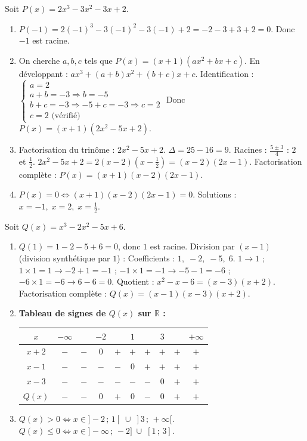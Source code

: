 \documentclass[11pt]{article}
\begin{document}
\begin{corrige}
Soit $P(x)=2x^3-3x^2-3x+2$.
\begin{enumerate}
\item $P(-1)=2(-1)^3-3(-1)^2-3(-1)+2 = -2-3+3+2=0$. Donc $-1$ est racine.
\item On cherche $a,b,c$ tels que $P(x)=(x+1)(ax^2+bx+c)$. En développant : $ax^3+(a+b)x^2+(b+c)x+c$. Identification :
$\begin{cases} a=2 \\ a+b=-3 \Rightarrow b=-5 \\ b+c=-3 \Rightarrow -5+c=-3 \Rightarrow c=2 \\ c=2 \text{ (vérifié)} \end{cases}$
Donc $P(x)=(x+1)(2x^2-5x+2)$.
\item Factorisation du trinôme : $2x^2-5x+2$. $\Delta=25-16=9$. Racines : $\frac{5\pm3}{4}$ : $2$ et $\frac12$. $2x^2-5x+2 = 2(x-2)(x-\frac12) = (x-2)(2x-1)$.
Factorisation complète : $\boxed{P(x) = (x+1)(x-2)(2x-1)}$.
\item $P(x)=0 \iff (x+1)(x-2)(2x-1)=0$. Solutions : $\boxed{x=-1,\; x=2,\; x=\frac12}$.
\end{enumerate}
\end{corrige}

\begin{corrige}
Soit $Q(x)=x^3-2x^2-5x+6$.
\begin{enumerate}
\item $Q(1)=1-2-5+6=0$, donc $1$ est racine. Division par $(x-1)$ (division synthétique par $1$) :
Coefficients : $1,\;-2,\;-5,\;6$.
$1 \rightarrow 1$ ; $1\times1=1 \rightarrow -2+1=-1$ ; $-1\times1=-1 \rightarrow -5-1=-6$ ; $-6\times1=-6 \rightarrow 6-6=0$.
Quotient : $x^2 - x - 6 = (x-3)(x+2)$.
Factorisation complète : $\boxed{Q(x) = (x-1)(x-3)(x+2)}$.
\item \textbf{Tableau de signes de $Q(x)$ sur $\mathbb{R}$ :}
\begin{center}
\begin{tabular}{|c|ccccccccc|}\hline
$x$ & $-\infty$ & & $-2$ & & $1$ & & $3$ & & $+\infty$ \\ \hline
$x+2$ & $-$ & $-$ & $0$ & $+$ & $+$ & $+$ & $+$ & $+$ & $+$ \\
$x-1$ & $-$ & $-$ & $-$ & $-$ & $0$ & $+$ & $+$ & $+$ & $+$ \\
$x-3$ & $-$ & $-$ & $-$ & $-$ & $-$ & $-$ & $0$ & $+$ & $+$ \\ \hline
$Q(x)$ & $-$ & $-$ & $0$ & $+$ & $0$ & $-$ & $0$ & $+$ & $+$ \\ \hline
\end{tabular}
\end{center}
\item $Q(x) > 0 \iff x \in \boxed{]-2\,;\,1[ \;\cup\; ]3\,;\,+\infty[}$.
$Q(x) \le 0 \iff x \in \boxed{]-\infty\,;\,-2] \;\cup\; [1\,;\,3]}$.
\end{enumerate}
\end{corrige}
\end{document}
